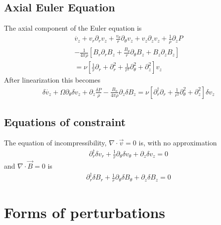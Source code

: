 \documentclass[letterpaper]{article}
\begin{document}
\subsection{Axial Euler Equation}
The axial component of the Euler equation is
\begin{align}
\dot{v_z} + v_r \partial_r v_z + \frac{v_\theta}{r}\partial_\theta v_z + v_z \partial_z v_z + \frac{1}{\rho}\partial_z P
\\ \nonumber
-\frac{1}{4\pi\rho}\left[B_r\partial_r B_z + \frac{B_\theta}{r}\partial_\theta B_z + B_z \partial_z B_z \right]
\\ \nonumber
=\nu\left[\frac{1}{r}\partial_r + \partial_r^2 + \frac{1}{r^2}\partial_\theta^2 + \partial_z^2\right]v_z
\end{align}
After linearization this becomes
\begin{align}
\delta\dot{v_z} + \Omega \partial_\theta \delta v_z + \partial_z \frac{\delta P}{\rho} -\frac{B_o}{4\pi\rho} \partial_z \delta B_z = \nu\left[\partial_r^\dagger \partial_r + \frac{1}{r^2}\partial_\theta^2 + \partial_z^2\right]\delta v_z
\end{align}

\subsection{Equations of constraint}

The equation of incompressibility, $\nabla\cdot\vec{v}=0$ is, with no approximation
\begin{align}
\partial_r^\dagger \delta v_r + \frac{1}{r}\partial_\theta \delta v_\theta + \partial_z \delta v_z = 0
\end{align}
and $\nabla\cdot\vec{B}=0$ is
\begin{align}
\partial_r^\dagger \delta B_r + \frac{1}{r}\partial_\theta \delta B_\theta + \partial_z \delta B_z = 0
\end{align}

\section{Forms of perturbations}
\end{document}
